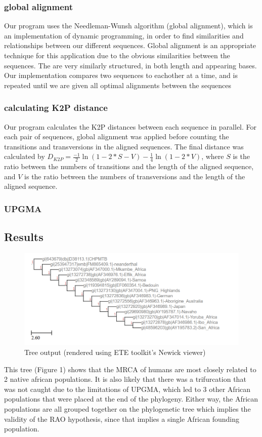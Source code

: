 \documentclass[a4paper]{article}
\begin{document}
\subsubsection{global alignment}
Our program uses the Needleman-Wunsh algorithm (global alignment), which is an implementation of dynamic programming, in order to find similarities and relationships between our different sequences. Global alignment is an appropriate technique for this application due to the obvious similarities between the sequences. The are very similarly structured, in both length and appearing bases. Our implementation compares two sequences to eachother at a time, and is repeated until we are given all optimal alignments between the sequences



\subsubsection{calculating K2P distance}
Our program calculates the K2P distances between each sequence in parallel. For each pair of sequences, global alignment was applied before counting the transitions and transversions in the aligned sequences. The final distance was calculated by $D_{K2P}=\frac{-1}{2} \ln(1 - 2 * S - V) - \frac{1}{4} \ln(1 - 2 * V)$, where $S$ is the ratio between the numbers of transitions and the length of the aligned sequence, and $V$ is the ratio between the numbers of transversions and the length of the aligned sequence.

\subsubsection{UPGMA}




\subsection{Results}
\begin{figure}
    \centering
    \includegraphics[scale=0.8]{bioinformatics.PNG}
    \caption{Tree output (rendered using ETE toolkit's Newick viewer)}
    \label{fig:my_label}
\end{figure}
This tree (Figure 1) shows that the MRCA of humans are most closely related to 2 native african populations. It is also likely that there was a trifurcation that was not caught due to the limitations of UPGMA, which led to 3 other African populations that were placed at the end of the phylogeny. Either way, the African populations are all grouped together on the phylogenetic tree which implies the validity of the RAO hypothesis, since that implies a single African founding population.




\end{document}
